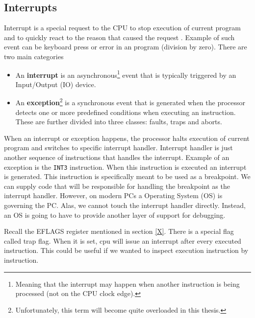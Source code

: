 \subsection{Interrupts}
Interrupt is a special request to the CPU to stop execution of current program
and to quickly react to the reason that caused the request
\cite{aps-interrupts}. Example of such event can be keyboard press or error in
an program (division by zero). There are two main categories
\cite{intel-manual}
\begin{itemize}
    \item An \textbf{interrupt} is an asynchronous\footnote{Meaning that the
    interrupt may happen when another instruction is being processed (not on
the CPU clock edge).} event that is typically triggered by an Input/Output (IO)
device. \item An \textbf{exception}\footnote{Unfortunately, this term will
    become quite overloaded in this thesis.} is a synchronous event that is
        generated when the processor detects one or more predefined conditions
        when executing an instruction. These are further divided into three
        classes: faults, traps and aborts.
\end{itemize}

When an interrupt or exception happens, the processor halts execution of
current program and switches to specific interrupt handler. Interrupt handler
is just another sequence of instructions that handles the interrupt. Example of
an exception is the \texttt{INT3} instruction. When this instruction is
executed an interrupt is generated. This instruction is specifically meant to
be used as a breakpoint. We can supply code that will be responsible for
handling the breakpoint as the interrupt handler. However, on modern PCs a
Operating System (OS) is governing the PC. Alas, we cannot touch the interrupt
handler directly. Instead, an OS is going to have to provide another layer of
support for debugging.

Recall the EFLAGS register mentioned in section \ref{X}. There is a special
flag called trap flag. When it is set, cpu will issue an interrupt after every
executed instruction. This could be useful if we wanted to inspect execution
instruction by instruction.


